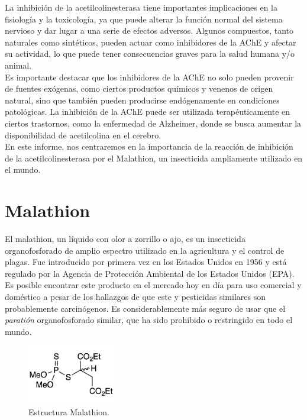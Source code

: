 La inhibición de la acetilcolinesterasa tiene importantes implicaciones en la fisiología y la toxicología, ya que puede alterar la función normal del sistema nervioso y dar lugar a una serie de efectos adversos. Algunos compuestos, tanto naturales como sintéticos, pueden actuar como inhibidores de la AChE y afectar su actividad, lo que puede tener consecuencias graves para la salud humana y/o animal. \cite{nogueira2015toxicology}\\

Es importante destacar que los inhibidores de la AChE no solo pueden provenir de fuentes exógenas, como ciertos productos químicos y venenos de origen natural, sino que también pueden producirse endógenamente en condiciones patológicas. La inhibición de la AChE puede ser utilizada terapéuticamente en ciertos trastornos, como la enfermedad de Alzheimer, donde se busca aumentar la disponibilidad de acetilcolina en el cerebro. \cite{bartels2010parkinson}\\

En este informe, nos centraremos en la importancia de la reacción de inhibición de la acetilcolinesterasa por el Malathion, un insecticida ampliamente utilizado en el mundo. \cite{Geed2016}


\section{Malathion}

El malathion, un líquido con olor a zorrillo o ajo, es un insecticida organofosforado de amplio espectro  utilizado en la agricultura  y el control de plagas. Fue introducido por primera vez en los Estados Unidos en 1956 y está regulado por la Agencia de Protección Ambiental de los Estados Unidos (EPA).\\
Es posible encontrar este producto en el mercado hoy en día para uso comercial y doméstico a pesar de los hallazgos de que este y pesticidas similares son probablemente carcinógenos. Es considerablemente más seguro de usar que el \textit{paratión} organofosforado similar, que ha sido prohibido o restringido en todo el mundo.\cite{ACS} \\

\begin{figure}[h]
	\centering
	\includegraphics[width=1.5in]{img/f2.png}
	\caption{Estructura Malathion.}
	\label{2}
\end{figure}


